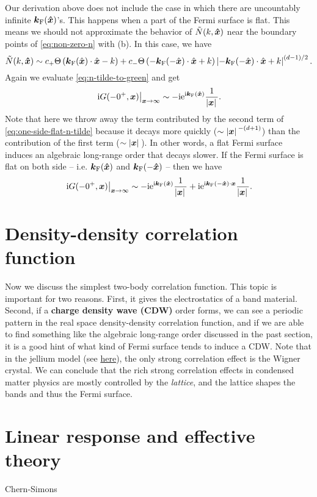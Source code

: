 \documentclass[hyperref, a4paper]{article}
\newcommand*{\ii}{\mathrm{i}}
\newcommand*{\ee}{\mathrm{e}}
\newcommand*{\concept}[1]{{\textbf{#1}}}
\begin{document}
Our derivation above does not include the case in which there are uncountably infinite $\vb*{k}_\text{F}(\vu*{x})$'s.
This happens when a part of the Fermi surface is flat. This means we should not approximate the behavior 
of $\tilde{N}(k, \vu*{x})$ near the boundary points of \eqref{eq:non-zero-n} with (b).
In this case, we have 
\begin{equation}
    \tilde{N}(k, \vu*{x}) \sim c_+ \Theta\left(\boldsymbol{k}_\text{F}(\hat{\boldsymbol{x}}) \cdot \hat{\boldsymbol{x}}-k\right) + c_- \Theta\left(- \boldsymbol{k}_\text{F}(-\hat{\boldsymbol{x}}) \cdot \hat{\boldsymbol{x}}+ k\right) \left|-\boldsymbol{k}_\text{F}(-\hat{\boldsymbol{x}}) \cdot \hat{\boldsymbol{x}}+k\right|^{(d-1) / 2}.
    \label{eq:one-side-flat-n-tilde}
\end{equation}
Again we evaluate \eqref{eq:n-tilde-to-green} and get 
\begin{equation}
    \left.\ii G(-0^+, \vb*{x})\right|_{\vb*{x} \to \infty} \sim - \ii \ee^{\ii \vb*{k}_\text{F}(\vu*{x})} \frac{1}{\abs*{\vb*{x}}}.
\end{equation}
Note that here we throw away the term contributed by the second term of \eqref{eq:one-side-flat-n-tilde}
because it decays more quickly ($\sim \abs*{\vb*{x}}^{-(d+1)}$) than the contribution of the first term 
($\sim \abs*{\vb*{x}}$). In other words, a flat Fermi surface induces an algebraic long-range order that decays slower.
If the Fermi surface is flat on both side -- i.e. $\vb*{k}_\text{F}(\vu*{x})$ and $\vb*{k}_\text{F}(-\vu*{x})$ --
then we have 
\begin{equation}
    \left.\ii G(-0^+, \vb*{x})\right|_{\vb*{x} \to \infty} \sim - \ii \ee^{\ii \vb*{k}_\text{F}(\vu*{x})} \frac{1}{\abs*{\vb*{x}}} + \ii \ee^{\ii \vb*{k}_\text{F}(- \vu*{x}) \cdot \vb*{x}} \frac{1}{\abs*{\vb*{x}}}.
\end{equation}

\section{Density-density correlation function}

Now we discuss the simplest two-body correlation function.  This topic is important for two reasons. 
First, it gives the electrostatics of a band material. Second, if a \concept{charge density wave (CDW)}
order forms, we can see a periodic pattern in the real space density-density correlation function,
and if we are able to find something like the algebraic long-range order discussed in the past section,
it is a good hint of what kind of Fermi surface tends to induce a CDW. Note that in the jellium model 
(see \href{electron-gas.pdf}{here}), the only strong correlation effect is the Wigner crystal. 
We can conclude that the rich strong correlation effects in condensed matter physics are mostly 
controlled by the \emph{lattice}, and the lattice shapes the bands and thus the Fermi surface.



\section{Linear response and effective theory}

Chern-Simons
\end{document}
